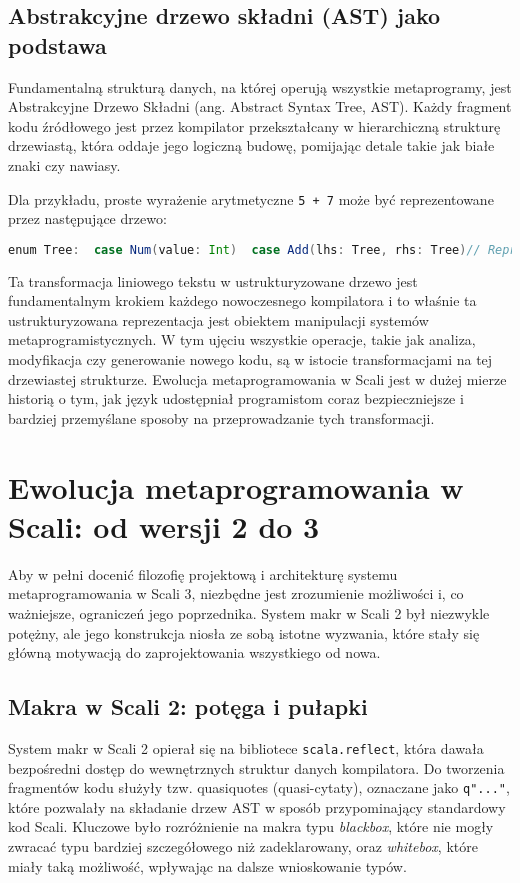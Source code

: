 \subsection{Abstrakcyjne drzewo składni (AST) jako podstawa}
Fundamentalną strukturą danych, na której operują wszystkie metaprogramy, jest Abstrakcyjne Drzewo Składni (ang. Abstract Syntax Tree, AST).
Każdy fragment kodu źródłowego jest przez kompilator przekształcany w hierarchiczną strukturę drzewiastą, która oddaje jego logiczną budowę, pomijając detale takie jak białe znaki czy nawiasy.

Dla przykładu, proste wyrażenie arytmetyczne \verb|5 + 7| może być reprezentowane przez następujące drzewo:
\begin{lstlisting}[language=Scala,caption={Przykładowa reprezentacja AST i wyrażenia 5 + 7},label={lst:ast-example}]
enum Tree:  case Num(value: Int)  case Add(lhs: Tree, rhs: Tree)// Reprezentacja AST dla `5 + 7`:Add(Num(5), Num(7))
\end{lstlisting}

Ta transformacja liniowego tekstu w ustrukturyzowane drzewo jest fundamentalnym krokiem każdego nowoczesnego kompilatora i to właśnie ta ustrukturyzowana reprezentacja jest obiektem manipulacji systemów metaprogramistycznych.
W tym ujęciu wszystkie operacje, takie jak analiza, modyfikacja czy generowanie nowego kodu, są w istocie transformacjami na tej drzewiastej strukturze.
Ewolucja metaprogramowania w Scali jest w dużej mierze historią o tym, jak język udostępniał programistom coraz bezpieczniejsze i bardziej przemyślane sposoby na przeprowadzanie tych transformacji.


\section{Ewolucja metaprogramowania w Scali: od wersji 2 do 3}
Aby w pełni docenić filozofię projektową i architekturę systemu metaprogramowania w Scali 3, niezbędne jest zrozumienie możliwości i, co ważniejsze, ograniczeń jego poprzednika.
System makr w Scali 2 był niezwykle potężny, ale jego konstrukcja niosła ze sobą istotne wyzwania, które stały się główną motywacją do zaprojektowania wszystkiego od nowa.

\subsection{Makra w Scali 2: potęga i pułapki}
System makr w Scali 2 opierał się na bibliotece \texttt{scala.reflect}, która dawała bezpośredni dostęp do wewnętrznych struktur danych kompilatora.
Do tworzenia fragmentów kodu służyły tzw. quasiquotes (quasi-cytaty), oznaczane jako \verb|q"..."|, które pozwalały na składanie drzew AST w sposób przypominający standardowy kod Scali.
Kluczowe było rozróżnienie na makra typu \textit{blackbox}, które nie mogły zwracać typu bardziej szczegółowego niż zadeklarowany, oraz \textit{whitebox}, które miały taką możliwość, wpływając na dalsze wnioskowanie typów.

